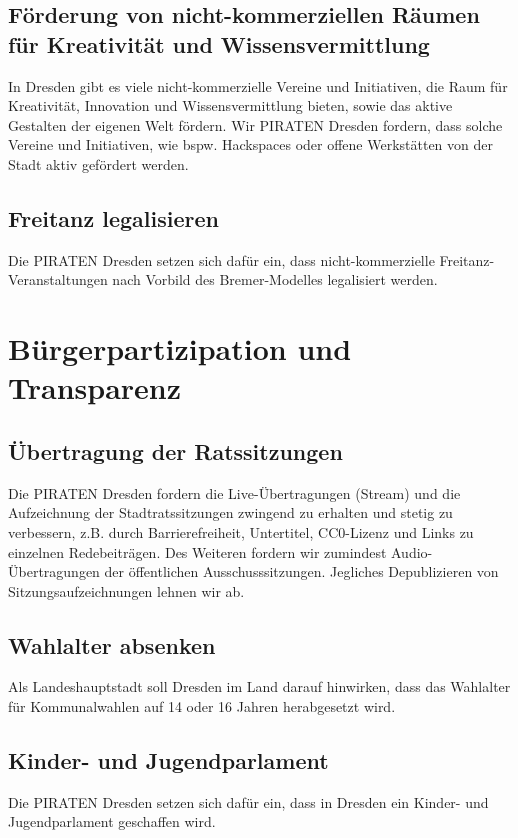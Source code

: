 \documentclass[a4paper, 11pt]{article}
\begin{document}
\subsection{Förderung von nicht-kommerziellen Räumen für Kreativität und Wissensvermittlung}
In Dresden gibt es viele nicht-kommerzielle Vereine und Initiativen, die Raum für Kreativität, Innovation und Wissensvermittlung bieten, sowie das aktive Gestalten der eigenen Welt fördern. Wir PIRATEN Dresden fordern, dass solche Vereine und Initiativen, wie bspw. Hackspaces oder offene Werkstätten von der Stadt aktiv gefördert werden.


\subsection{Freitanz legalisieren}
Die PIRATEN Dresden setzen sich dafür ein, dass nicht-kommerzielle Freitanz-Veranstaltungen nach Vorbild des Bremer-Modelles legalisiert werden.



\section{Bürgerpartizipation und Transparenz}

\subsection{Übertragung der Ratssitzungen}
Die PIRATEN Dresden fordern die Live-Übertragungen (Stream) und die Aufzeichnung der Stadtratssitzungen zwingend zu erhalten und stetig zu verbessern, z.B. durch Barrierefreiheit, Untertitel, CC0-Lizenz und Links zu einzelnen Redebeiträgen. Des Weiteren fordern wir zumindest Audio-Übertragungen der öffentlichen Ausschusssitzungen. Jegliches Depublizieren von Sitzungsaufzeichnungen lehnen wir ab.




\subsection{Wahlalter absenken}
Als Landeshauptstadt soll Dresden im Land darauf hinwirken, dass das Wahlalter für Kommunalwahlen auf 14 oder 16 Jahren herabgesetzt wird.


\subsection{Kinder- und Jugendparlament}
Die PIRATEN Dresden setzen sich dafür ein, dass in Dresden ein Kinder- und Jugendparlament geschaffen wird.
\end{document}
